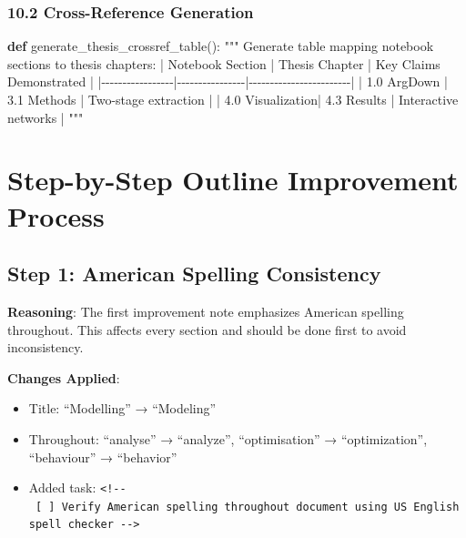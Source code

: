 \documentclass[
  11pt,
  letterpaper,
]{book}
\newenvironment{Shaded}{\begin{snugshade}}{\end{snugshade}}
\newcommand{\CommentTok}[1]{\textcolor[rgb]{0.37,0.37,0.37}{#1}}
\newcommand{\KeywordTok}[1]{\textcolor[rgb]{0.00,0.23,0.31}{\textbf{#1}}}
\newcommand{\NormalTok}[1]{\textcolor[rgb]{0.00,0.23,0.31}{#1}}
\providecommand{\tightlist}{%
  \setlength{\itemsep}{0pt}\setlength{\parskip}{0pt}}
\begin{document}
\subsubsection{10.2 Cross-Reference
Generation}\label{cross-reference-generation}

\begin{Shaded}
\begin{Highlighting}[]
\KeywordTok{def}\NormalTok{ generate\_thesis\_crossref\_table():}
    \CommentTok{"""}
\CommentTok{    Generate table mapping notebook sections to thesis chapters:}
\CommentTok{    }
\CommentTok{    | Notebook Section | Thesis Chapter | Key Claims Demonstrated |}
\CommentTok{    |{-}{-}{-}{-}{-}{-}{-}{-}{-}{-}{-}{-}{-}{-}{-}{-}{-}|{-}{-}{-}{-}{-}{-}{-}{-}{-}{-}{-}{-}{-}{-}{-}{-}|{-}{-}{-}{-}{-}{-}{-}{-}{-}{-}{-}{-}{-}{-}{-}{-}{-}{-}{-}{-}{-}{-}{-}{-}|}
\CommentTok{    | 1.0 ArgDown     | 3.1 Methods    | Two{-}stage extraction   |}
\CommentTok{    | 4.0 Visualization| 4.3 Results   | Interactive networks   |}
\CommentTok{    """}
\end{Highlighting}
\end{Shaded}

\section{Step-by-Step Outline Improvement
Process}\label{step-by-step-outline-improvement-process}

\subsection{Step 1: American Spelling
Consistency}\label{step-1-american-spelling-consistency}

\textbf{Reasoning}: The first improvement note emphasizes American
spelling throughout. This affects every section and should be done first
to avoid inconsistency.

\textbf{Changes Applied}:

\begin{itemize}
\tightlist
\item
  Title: ``Modelling'' → ``Modeling''
\item
  Throughout: ``analyse'' → ``analyze'', ``optimisation'' →
  ``optimization'', ``behaviour'' → ``behavior''
\item
  Added task:
  \texttt{\textless{}!-\/-\ {[}\ {]}\ Verify\ American\ spelling\ throughout\ document\ using\ US\ English\ spell\ checker\ -\/-\textgreater{}}
\end{itemize}
\end{document}
